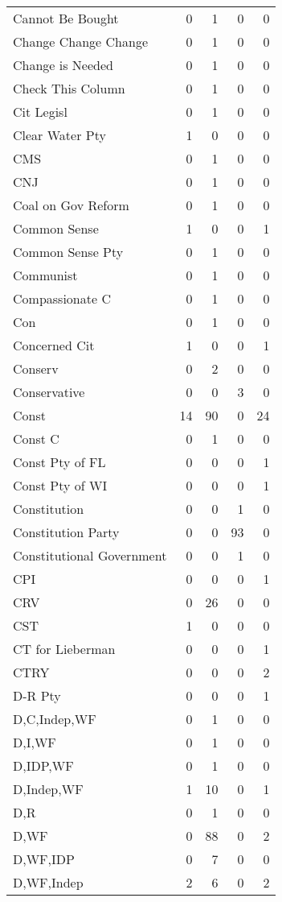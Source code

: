 \begin{supertabular}{lrrrr}
Cannot Be Bought & 0 & 1 & 0 & 0\\
Change Change Change & 0 & 1 & 0 & 0\\
Change is Needed & 0 & 1 & 0 & 0\\
Check This Column & 0 & 1 & 0 & 0\\
Cit Legisl & 0 & 1 & 0 & 0\\
Clear Water Pty & 1 & 0 & 0 & 0\\
CMS & 0 & 1 & 0 & 0\\
CNJ & 0 & 1 & 0 & 0\\
Coal on Gov Reform & 0 & 1 & 0 & 0\\
Common Sense & 1 & 0 & 0 & 1\\
Common Sense Pty & 0 & 1 & 0 & 0\\
Communist & 0 & 1 & 0 & 0\\
Compassionate C & 0 & 1 & 0 & 0\\
Con & 0 & 1 & 0 & 0\\
Concerned Cit & 1 & 0 & 0 & 1\\
Conserv & 0 & 2 & 0 & 0\\
Conservative & 0 & 0 & 3 & 0\\
Const & 14 & 90 & 0 & 24\\
Const C & 0 & 1 & 0 & 0\\
Const Pty of FL & 0 & 0 & 0 & 1\\
Const Pty of WI & 0 & 0 & 0 & 1\\
Constitution & 0 & 0 & 1 & 0\\
Constitution Party & 0 & 0 & 93 & 0\\
Constitutional Government & 0 & 0 & 1 & 0\\
CPI & 0 & 0 & 0 & 1\\
CRV & 0 & 26 & 0 & 0\\
CST & 1 & 0 & 0 & 0\\
CT for Lieberman & 0 & 0 & 0 & 1\\
CTRY & 0 & 0 & 0 & 2\\
D-R Pty & 0 & 0 & 0 & 1\\
D,C,Indep,WF & 0 & 1 & 0 & 0\\
D,I,WF & 0 & 1 & 0 & 0\\
D,IDP,WF & 0 & 1 & 0 & 0\\
D,Indep,WF & 1 & 10 & 0 & 1\\
D,R & 0 & 1 & 0 & 0\\
D,WF & 0 & 88 & 0 & 2\\
D,WF,IDP & 0 & 7 & 0 & 0\\
D,WF,Indep & 2 & 6 & 0 & 2\\

\end{supertabular}
